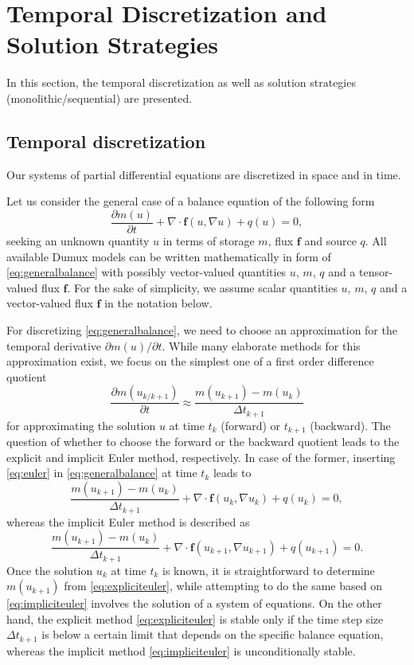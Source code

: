 \section{Temporal Discretization and Solution Strategies}
In this section, the temporal discretization as well as solution strategies (monolithic/sequential) are presented.

\subsection{Temporal discretization}

Our systems of partial differential equations are discretized in space and in time.

Let us consider the general case of a balance equation of the following form
\begin{equation}\label{eq:generalbalance}
\frac{\partial m(u)}{\partial t} + \nabla\cdot\mathbf{f}(u, \nabla u) + q(u) = 0,
\end{equation}
seeking an unknown quantity $u$ in terms of storage $m$, flux $\mathbf{f}$ and source $q$.
All available Dumux models can be written mathematically in form of \eqref{eq:generalbalance}
with possibly vector-valued quantities $u$, $m$, $q$ and a tensor-valued flux $\mathbf{f}$.
For the sake of simplicity, we assume scalar quantities $u$, $m$, $q$ and a vector-valued
flux $\mathbf{f}$ in the notation below.

For discretizing \eqref{eq:generalbalance}, we need to choose an
approximation for the temporal derivative $\partial m(u)/\partial t$.
While many elaborate methods for this approximation exist,
we focus on the simplest one of a first order difference quotient
\begin{equation}\label{eq:euler}
\frac{\partial m(u_{k/k+1})}{\partial t}
\approx \frac{m(u_{k+1}) - m(u_k)}{\Delta t_{k+1}}
\end{equation}
for approximating the solution $u$ at time $t_k$ (forward) or $t_{k+1}$ (backward).
The question of whether to choose the forward or the backward quotient leads to the
explicit and implicit Euler method, respectively.
In case of the former, inserting \eqref{eq:euler} in \eqref{eq:generalbalance}
at time $t_k$ leads to
\begin{equation}\label{eq:expliciteuler}
\frac{m(u_{k+1}) - m(u_k)}{\Delta t_{k+1}} + \nabla\cdot\mathbf{f}(u_k, \nabla u_k) + q(u_k) = 0,
\end{equation}
whereas the implicit Euler method is described as
\begin{equation}\label{eq:impliciteuler}
\frac{m(u_{k+1}) - m(u_k)}{\Delta t_{k+1}}
+ \nabla\cdot\mathbf{f}(u_{k+1}, \nabla u_{k+1}) + q(u_{k+1}) = 0.
\end{equation}
Once the solution $u_k$ at time $t_k$ is known, it is straightforward
to determine $m(u_{k+1})$ from \eqref{eq:expliciteuler},
while attempting to do the same based on \eqref{eq:impliciteuler}
involves the solution of a system of equations.
On the other hand, the explicit method \eqref{eq:expliciteuler} is stable only
if the time step size $\Delta t_{k+1}$ is below a certain limit that depends
on the specific balance equation, whereas the implicit method \eqref{eq:impliciteuler}
is unconditionally stable.

